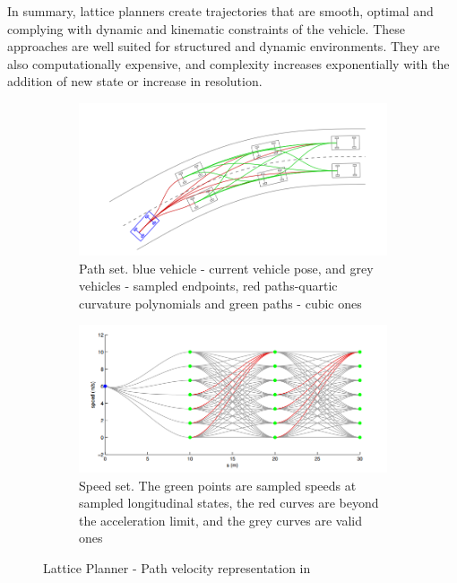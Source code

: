 In summary, lattice planners create trajectories that are smooth, optimal and complying with dynamic and kinematic constraints of the vehicle. These approaches are well suited for structured and dynamic environments. They are also computationally expensive, and complexity increases exponentially with the addition of new state or increase in resolution.

\begin{figure}
	\centering
	\begin{subfigure}{.51\textwidth}
		\centering
		\includegraphics[width=1.0\linewidth]{Images/related_work/traj_optim_1.png}
		\caption{Path set. blue vehicle - current vehicle pose, and grey vehicles - sampled endpoints, red paths-quartic curvature polynomials and green paths - cubic ones}
		\label{trajoptsub1}
	\end{subfigure}\hspace{.01\textwidth}
	\begin{subfigure}{.47\textwidth}
		\centering
		\includegraphics[width=1.0\linewidth]{Images/related_work/traj_optim_2.png}
		\caption{Speed set. The green points are sampled speeds at sampled longitudinal states, the red curves are beyond the acceleration limit, and the grey curves are valid ones}
		\label{trajoptsub2}
	\end{subfigure}
	\caption{Lattice Planner - Path velocity representation in \cite{traj_planner_optimization}}
	\label{trajopt}
\end{figure}

